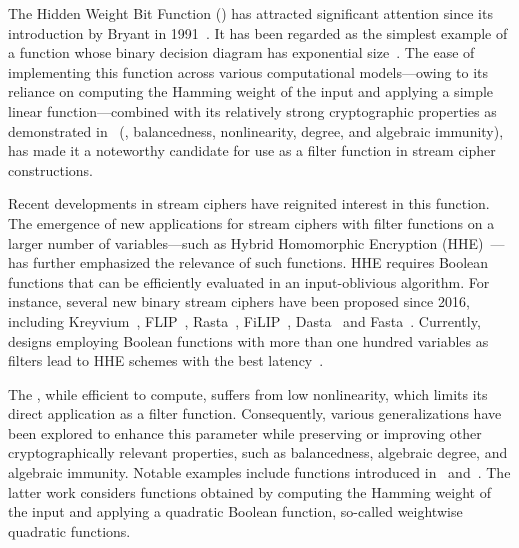 \documentclass[11pt]{llncs}
\begin{document}
\fi

The Hidden Weight Bit Function (\hwbf{}) has attracted significant attention since its introduction by Bryant in 1991~\cite{IEEE:Bryant91}. It has been regarded as the simplest example of a function whose binary decision diagram has exponential size~\cite{IEEE:Bryant91,TIA:BoLSW99}. The ease of implementing this function across various computational models—owing to its reliance on computing the Hamming weight of the input and applying a simple linear function—combined with its relatively strong cryptographic properties as demonstrated in~\cite{DAM:WCST14} (\eg, balancedness, nonlinearity, degree, and algebraic immunity), has made it a noteworthy candidate for use as a filter function in stream cipher constructions.

Recent developments in stream ciphers have reignited interest in this function. The emergence of new applications for stream ciphers with filter functions on a larger number of variables—such as Hybrid Homomorphic Encryption (\textsf{HHE})~\cite{CCS:NaeLauVai11}—has further emphasized the relevance of such functions. \textsf{HHE} requires Boolean functions that can be efficiently evaluated in an input-oblivious algorithm. For instance, several new binary stream ciphers have been proposed since 2016, including Kreyvium~\cite{JOC:CCFLNP18}, \textsf{FLIP}~\cite{EC:MJSC16}, Rasta~\cite{C:Rasta}, \textsf{FiLIP}~\cite{INDO:MCJS19}, Dasta~\cite{TOSC:BeiLea20} and Fasta~\cite{CTRSA:CidIndRad22}. 
Currently, designs employing Boolean functions with more than one hundred variables as filters lead to \textsf{HHE} schemes with the best latency~\cite{INDO:HofMeaRic20,CCS:CDPP22,CIC:MeaParPei24,eprint:AGHM24}.

The \hwbf{}, while efficient to compute, suffers from low nonlinearity, which limits its direct application as a filter function. Consequently, various generalizations have been explored to enhance this parameter while preserving or improving other cryptographically relevant properties, such as balancedness, algebraic degree, and algebraic immunity. Notable examples include functions introduced in~\cite{IEEE:Carlet22,eprint:CarPar23} and~\cite{DAM:MeaOza24}. The latter work considers functions obtained by computing the Hamming weight of the input and applying a quadratic Boolean function, so-called weightwise quadratic functions.
\end{document}

